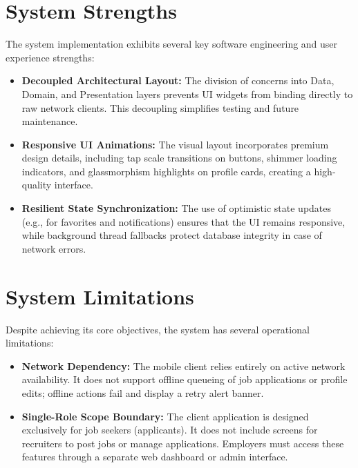 \section{System Strengths}
The system implementation exhibits several key software engineering and user experience strengths:
\begin{itemize}
    \item \textbf{Decoupled Architectural Layout:} The division of concerns into Data, Domain, and Presentation layers prevents UI widgets from binding directly to raw network clients. This decoupling simplifies testing and future maintenance.
    \item \textbf{Responsive UI Animations:} The visual layout incorporates premium design details, including tap scale transitions on buttons, shimmer loading indicators, and glassmorphism highlights on profile cards, creating a high-quality interface.
    \item \textbf{Resilient State Synchronization:} The use of optimistic state updates (e.g., for favorites and notifications) ensures that the UI remains responsive, while background thread fallbacks protect database integrity in case of network errors.
\end{itemize}

\section{System Limitations}
Despite achieving its core objectives, the system has several operational limitations:
\begin{itemize}
    \item \textbf{Network Dependency:} The mobile client relies entirely on active network availability. It does not support offline queueing of job applications or profile edits; offline actions fail and display a retry alert banner.
    \item \textbf{Single-Role Scope Boundary:} The client application is designed exclusively for job seekers (applicants). It does not include screens for recruiters to post jobs or manage applications. Employers must access these features through a separate web dashboard or admin interface.
\end{itemize}
